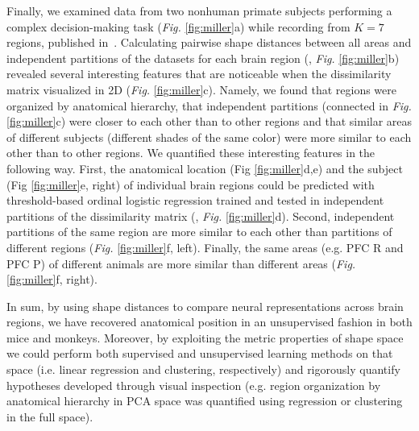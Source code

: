 Finally, we examined data from two nonhuman primate subjects performing a complex decision-making task (\textit{Fig.} \ref{fig:miller}a) while recording from $K=7$ regions, published in~\textcite{Siegel2015-cz}. 
Calculating pairwise shape distances between all areas and independent  partitions of the datasets for each brain region (\textit{}, \textit{Fig.} \ref{fig:miller}b) revealed several interesting features that are noticeable when the dissimilarity matrix visualized in 2D (\textit{Fig.} \ref{fig:miller}c). Namely, we found that regions were organized by anatomical hierarchy, that independent partitions (connected in \textit{Fig.} \ref{fig:miller}c) were closer to each other than to other regions and that similar areas of different subjects (different shades of the same color) were more similar to each other than to other regions.
We quantified these interesting features in the following way. First, the anatomical location (Fig \ref{fig:miller}d,e) and the subject (Fig \ref{fig:miller}e, right) of individual brain regions could be predicted with threshold-based ordinal logistic regression trained and tested in independent partitions of the dissimilarity matrix (\textit{}, \textit{Fig.} \ref{fig:miller}d). Second, independent partitions of the same region are more similar to each other than partitions of different regions (\textit{Fig.} \ref{fig:miller}f, left). Finally, the same areas (e.g. PFC R and PFC P) of different animals are more similar than different areas (\textit{Fig.} \ref{fig:miller}f, right).   

In sum, by using shape distances to compare neural representations across brain regions, we have recovered anatomical position in an unsupervised fashion in both mice and monkeys.
Moreover, by exploiting the metric properties of shape space we could perform both supervised and unsupervised learning methods on that space (i.e. linear regression and clustering, respectively) and rigorously quantify hypotheses developed through visual inspection (e.g. region organization by anatomical hierarchy in PCA space was quantified using regression or clustering in the full space).

